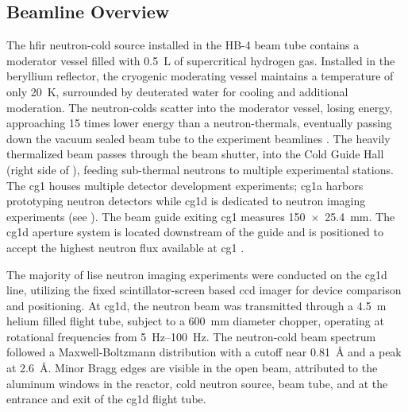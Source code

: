 \documentclass[../../../main.tex]{subfiles}%
\begin{document}
%
    \subsection{Beamline Overview}%
    \label{sec:chapter-3:beamline-testing:beamline-overview}%
    The \gls{hfir} \gls{neutron-cold} source installed in the HB-4 beam tube contains a moderator vessel filled with \SI{0.5}{\liter} of supercritical hydrogen gas.
    Installed in the beryllium reflector, the cryogenic moderating vessel maintains a temperature of only \SI{20}{\kelvin}, surrounded by deuterated water for cooling and additional moderation.
    The \glspl{neutron-cold} scatter into the moderator vessel, losing energy, approaching \num{15} times lower energy than a \glspl{neutron-thermal}, eventually passing down the vacuum sealed beam tube to the experiment \glspl{beamline} \cite{Farrell_2001}.
    The heavily thermalized beam passes through the beam shutter, into the Cold Guide Hall (right side of ), feeding sub-thermal neutrons to multiple experimental stations.
    The \gls{cg1} houses multiple detector development experiments; \gls{cg1a} harbors prototyping neutron detectors while \gls{cg1d} is dedicated to neutron imaging experiments (see ).
    The beam guide exiting \gls{cg1} measures \SI{150 x 25.4}{\milli\meter}.
    The \gls{cg1d} aperture system is located downstream of the guide and is positioned to accept the highest neutron flux available at \gls{cg1} \cite{Crow_2011}.
    \par%
    The majority of \gls{lise} neutron imaging experiments were conducted on the \gls{cg1d} line, utilizing the fixed \gls{scintillator-screen} based \gls{ccd} imager for device comparison and positioning.
    At \gls{cg1d}, the neutron beam was transmitted through a \SI{4.5}{\meter} helium filled flight tube, subject to a \SI{600}{\milli\meter} diameter chopper, operating at rotational frequencies from \SIrange{5}{100}{\hertz}.
    The \gls{neutron-cold} beam spectrum followed a Maxwell-Boltzmann distribution with a cutoff near \SI{0.81}{\angstrom} and a peak at \SI{2.6}{\angstrom}.
    Minor Bragg edges are visible in the open beam, attributed to the aluminum windows in the reactor, cold neutron source, beam tube, and at the entrance and exit of the \gls{cg1d} flight tube.
\end{document}
